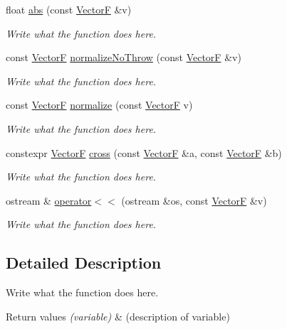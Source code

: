 \begin{DoxyCompactItemize}
float \hyperlink{structVectorF_a34fe870a7141fd569c7144399f50c9a4}{abs} (const \hyperlink{structVectorF}{Vector\+F} \&v)
\begin{DoxyCompactList}\small\item\em Write what the function does here. \end{DoxyCompactList}\item 
const \hyperlink{structVectorF}{Vector\+F} \hyperlink{structVectorF_ac72c1e0aeaabb3f1b9749c409db9114a}{normalize\+No\+Throw} (const \hyperlink{structVectorF}{Vector\+F} \&v)
\begin{DoxyCompactList}\small\item\em Write what the function does here. \end{DoxyCompactList}\item 
const \hyperlink{structVectorF}{Vector\+F} \hyperlink{structVectorF_a97332544d415a8540da3caea6581c52d}{normalize} (const \hyperlink{structVectorF}{Vector\+F} v)
\begin{DoxyCompactList}\small\item\em Write what the function does here. \end{DoxyCompactList}\item 
constexpr \hyperlink{structVectorF}{Vector\+F} \hyperlink{structVectorF_a968c41313af492c22f946584e83fb9f5}{cross} (const \hyperlink{structVectorF}{Vector\+F} \&a, const \hyperlink{structVectorF}{Vector\+F} \&b)
\begin{DoxyCompactList}\small\item\em Write what the function does here. \end{DoxyCompactList}\item 
ostream \& \hyperlink{structVectorF_a2e9914517f8e728e8e4e735cc09e19a2}{operator$<$$<$} (ostream \&os, const \hyperlink{structVectorF}{Vector\+F} \&v)
\begin{DoxyCompactList}\small\item\em Write what the function does here. \end{DoxyCompactList}\end{DoxyCompactItemize}


\subsection{Detailed Description}
Write what the function does here. 


\begin{DoxyRetVals}{Return values}
{\em (variable)} & (description of variable) \\
\hline
\end{DoxyRetVals}


